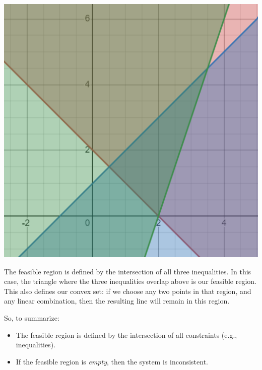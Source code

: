 \documentclass[letterpaper]{article}
\begin{document}
\begin{mdframed}
\begin{center}
        \includegraphics[scale=0.7]{../assets/consistent1.png}
    \end{center}
    The feasible region is defined by the intersection of all three inequalities. In this case, the triangle where the three inequalities overlap above is our feasible region. This also defines our convex set: if we choose any two points in that region, and any linear combination, then the resulting line will remain in this region. 
\end{mdframed}
So, to summarize:
\begin{itemize}
    \item The feasible region is defined by the intersection of all constraints (e.g., inequalities). 
    \item If the feasible region is \emph{empty}, then the system is inconsistent.
\end{itemize}
\end{document}
